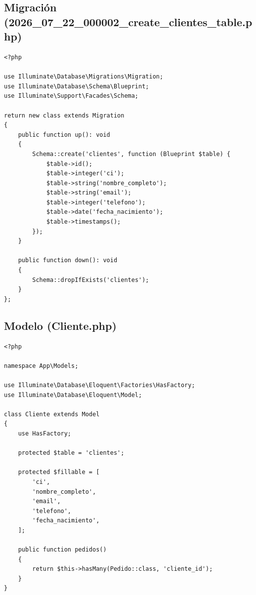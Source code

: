 \documentclass[12pt, letterpaper]{article}
\begin{document}
\subsection{Migración (2026\_07\_22\_000002\_create\_clientes\_table.php)}
\begin{lstlisting}[language=purePHP]
<?php

use Illuminate\Database\Migrations\Migration;
use Illuminate\Database\Schema\Blueprint;
use Illuminate\Support\Facades\Schema;

return new class extends Migration
{
    public function up(): void
    {
        Schema::create('clientes', function (Blueprint $table) {
            $table->id();
            $table->integer('ci');
            $table->string('nombre_completo');
            $table->string('email');
            $table->integer('telefono');
            $table->date('fecha_nacimiento');
            $table->timestamps();
        });
    }

    public function down(): void
    {
        Schema::dropIfExists('clientes');
    }
};
\end{lstlisting}

\subsection{Modelo (Cliente.php)}
\begin{lstlisting}[language=purePHP]
<?php

namespace App\Models;

use Illuminate\Database\Eloquent\Factories\HasFactory;
use Illuminate\Database\Eloquent\Model;

class Cliente extends Model
{
    use HasFactory;

    protected $table = 'clientes';

    protected $fillable = [
        'ci',
        'nombre_completo',
        'email',
        'telefono',
        'fecha_nacimiento',
    ];

    public function pedidos()
    {
        return $this->hasMany(Pedido::class, 'cliente_id');
    }
}
\end{lstlisting}
\end{document}
